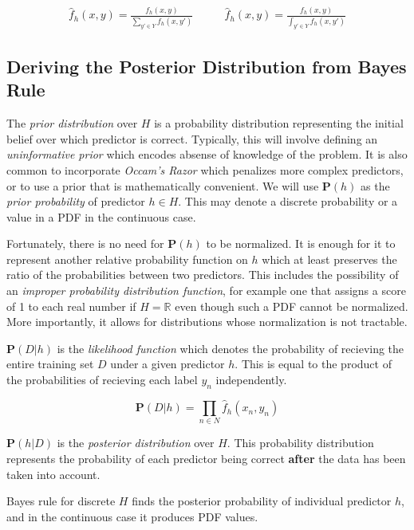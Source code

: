 \documentclass[twoside]{article}
\begin{document}
\begin{align}
\label{eq:normalized_probability_model}
\hat{f}_h(x, y)=\frac{f_h(x, y)}{\sum_{y' \in Y} f_h(x,y')} &
\qquad\hat{f}_h(x, y)=\frac{f_h(x, y)}{\int_{y' \in Y} f_h(x,y')}
\end{align}

\subsection{Deriving the Posterior Distribution from Bayes Rule}

The \textit{prior distribution} over \(H\) is a probability distribution representing the initial belief over which predictor is correct. Typically, this will involve defining an \textit{uninformative prior} which encodes absense of knowledge of the problem. It is also common to incorporate \textit{Occam's Razor} which penalizes more complex predictors, or to use a prior that is mathematically convenient. We will use \(\mathbf{P}(h)\) as the \textit{prior probability} of predictor \(h \in H\). This may denote a discrete probability or a value in a PDF in the continuous case.

Fortunately, there is no need for \(\mathbf{P}(h)\) to be normalized. It is enough for it to represent another relative probability function on \(h\) which at least preserves the ratio of the probabilities between two predictors. This includes the possibility of an \textit{improper probability distribution function}, for example one that assigns a score of 1 to each real number if \(H=\mathbb{R}\) even though such a PDF cannot be normalized. More importantly, it allows for distributions whose normalization is not tractable.

\(\mathbf{P}(D|h)\) is the \textit{likelihood function} which denotes the probability of recieving the entire training set \(D\) under a given predictor \(h\). This is equal to the product of the probabilities of recieving each label \(y_n\) independently.

\begin{equation}
\mathbf{P}(D|h)=\prod_{n \in N} \hat{f}_h(x_n,y_n)
\end{equation}

\(\mathbf{P}(h|D)\) is the \textit{posterior distribution} over \(H\). This probability distribution represents the probability of each predictor being correct \textbf{after} the data has been taken into account.

Bayes rule for discrete \(H\) finds the posterior probability of individual predictor \(h\), and in the continuous case it produces PDF values.
\end{document}
